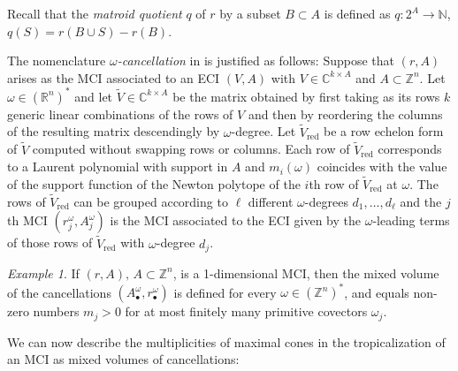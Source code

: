 \documentclass[a4paper]{article}
\theoremstyle{remark}
\newtheorem{example}{Example}
\def\NN{\mathbb{N}}
\def\RR{\mathbb{R}}
\def\CC{\mathbb{C}}
\def\ZZ{\mathbb{Z}}
\begin{document}
Recall that the \textit{matroid quotient} $q$ of $r$ by a subset $B\subset A$
is defined as $q : 2^A\rightarrow \NN$, $q(S) = r(B\cup S) - r(B)$.

The nomenclature {\em $\omega$-cancellation} in  is justified
as follows: Suppose that $(r,A)$ arises as the MCI associated to an
ECI $(V,A)$ with $V\in \CC^{k\times A}$ and $A\subset \ZZ^n$. Let
$\omega\in (\RR^n)^{*}$ and let $\tilde{V}\in \CC^{k\times A}$ be the matrix
obtained by first taking as its rows $k$ generic linear combinations
of the rows of $V$ and then by reordering the columns of the resulting
matrix descendingly by $\omega$-degree. Let $\tilde{V}_{\text{red}}$ be a
row echelon form of $\tilde{V}$ computed without swapping rows or
columns. Each row of $\tilde{V}_{\text{red}}$ corresponds to a Laurent
polynomial with support in $A$ and $m_i(\omega)$ coincides with the value
of the support function of the Newton polytope of the $i$th row of
$\tilde{V}_{\text{red}}$ at $\omega$. The rows of
$\tilde{V}_{\text{red}}$ can be grouped according to $\ell$ different
$\omega$-degrees $d_1,\dots,d_{\ell}$ and the $j$th MCI
$(r^{\omega}_j,A_j^{\omega})$ is the MCI associated to the ECI given by the
$\omega$-leading terms of those rows of $\tilde{V}_{\text{red}}$ with
$\omega$-degree $d_j$.

\begin{example}
  \label{ex:matroidcurve}
  If $(r,A),\,A\subset\ZZ^n$, is a 1-dimensional MCI, then
  the mixed volume of the cancellations $(A^\omega_{\bullet},r^\omega_{\bullet})$ is defined for
  every $\omega\in(\ZZ^n)^*$, and equals non-zero numbers $m_j>0$ for at most
  finitely many primitive covectors $\omega_j$.
\end{example}

We can now describe the multiplicities of maximal cones in the
tropicalization of an MCI as mixed volumes of cancellations:
\end{document}
